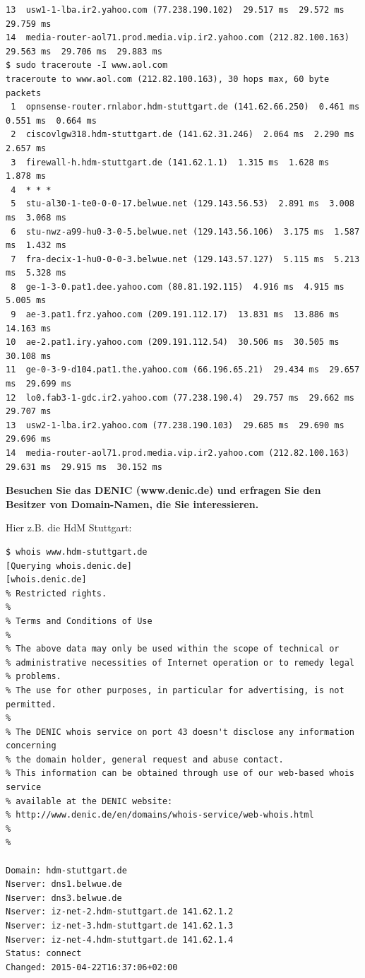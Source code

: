 \begin{verbatim}
13  usw1-1-lba.ir2.yahoo.com (77.238.190.102)  29.517 ms  29.572 ms  29.759 ms
14  media-router-aol71.prod.media.vip.ir2.yahoo.com (212.82.100.163)  29.563 ms  29.706 ms  29.883 ms
$ sudo traceroute -I www.aol.com
traceroute to www.aol.com (212.82.100.163), 30 hops max, 60 byte packets
 1  opnsense-router.rnlabor.hdm-stuttgart.de (141.62.66.250)  0.461 ms  0.551 ms  0.664 ms
 2  ciscovlgw318.hdm-stuttgart.de (141.62.31.246)  2.064 ms  2.290 ms  2.657 ms
 3  firewall-h.hdm-stuttgart.de (141.62.1.1)  1.315 ms  1.628 ms  1.878 ms
 4  * * *
 5  stu-al30-1-te0-0-0-17.belwue.net (129.143.56.53)  2.891 ms  3.008 ms  3.068 ms
 6  stu-nwz-a99-hu0-3-0-5.belwue.net (129.143.56.106)  3.175 ms  1.587 ms  1.432 ms
 7  fra-decix-1-hu0-0-0-3.belwue.net (129.143.57.127)  5.115 ms  5.213 ms  5.328 ms
 8  ge-1-3-0.pat1.dee.yahoo.com (80.81.192.115)  4.916 ms  4.915 ms  5.005 ms
 9  ae-3.pat1.frz.yahoo.com (209.191.112.17)  13.831 ms  13.886 ms  14.163 ms
10  ae-2.pat1.iry.yahoo.com (209.191.112.54)  30.506 ms  30.505 ms  30.108 ms
11  ge-0-3-9-d104.pat1.the.yahoo.com (66.196.65.21)  29.434 ms  29.657 ms  29.699 ms
12  lo0.fab3-1-gdc.ir2.yahoo.com (77.238.190.4)  29.757 ms  29.662 ms  29.707 ms
13  usw2-1-lba.ir2.yahoo.com (77.238.190.103)  29.685 ms  29.690 ms  29.696 ms
14  media-router-aol71.prod.media.vip.ir2.yahoo.com (212.82.100.163)  29.631 ms  29.915 ms  30.152 ms
\end{verbatim}

\textbf{Besuchen Sie das DENIC (www.denic.de) und erfragen Sie den
Besitzer von Domain-Namen, die Sie interessieren.}

Hier z.B. die HdM Stuttgart:

\begin{verbatim}
$ whois www.hdm-stuttgart.de
[Querying whois.denic.de]
[whois.denic.de]
% Restricted rights.
%
% Terms and Conditions of Use
%
% The above data may only be used within the scope of technical or
% administrative necessities of Internet operation or to remedy legal
% problems.
% The use for other purposes, in particular for advertising, is not permitted.
%
% The DENIC whois service on port 43 doesn't disclose any information concerning
% the domain holder, general request and abuse contact.
% This information can be obtained through use of our web-based whois service
% available at the DENIC website:
% http://www.denic.de/en/domains/whois-service/web-whois.html
%
%

Domain: hdm-stuttgart.de
Nserver: dns1.belwue.de
Nserver: dns3.belwue.de
Nserver: iz-net-2.hdm-stuttgart.de 141.62.1.2
Nserver: iz-net-3.hdm-stuttgart.de 141.62.1.3
Nserver: iz-net-4.hdm-stuttgart.de 141.62.1.4
Status: connect
Changed: 2015-04-22T16:37:06+02:00
\end{verbatim}

